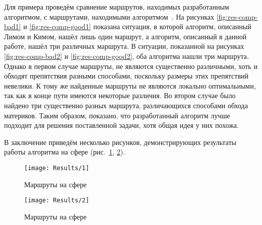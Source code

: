 Для примера проведём сравнение маршрутов, находимых разработанным
алгоритмом, с маршрутами, находимыми
алгоритмом~\cite{lim2005shortest}. На рисунках \ref{fig:res-comp-bad1}
и \ref{fig:res-comp-good1} показана ситуация, в которой алгоритм,
описанный Лимом и Кимом, нашёл лишь один маршрут, а алгоритм,
описанный в данной работе, нашёл три различных маршрута. В ситуации,
показанной на рисунках \ref{fig:res-comp-bad2} и
\ref{fig:res-comp-good2}, оба алгоритма нашли три маршрута. Однако в
первом случае маршруты, не являются существенно различными, хоть и
обходят препятствия разными способами, поскольку размеры этих
препятствий невелики. К тому же найденные маршруты не являются
локально оптимальными, так как в конце пути имеются некоторые
различия. Во втором случае было найдено три существенно разных
маршрута, различающихся способами обхода материков. Таким образом,
показано, что разработанный алгоритм лучше подходит для решения
поставленной задачи, хотя общая идея у них похожа.

В заключение приведём несколько рисунков, демонстрирующих результаты
работы алгоритма на сфере (рис.~\ref{fig:result1}, \ref{fig:result2}).

\begin{figure}
    \texttt{[image: Results/1]}
    \caption{Маршруты на сфере}
    \label{fig:result1}
\end{figure}

\begin{figure}
    \texttt{[image: Results/2]}
    \caption{Маршруты на сфере}
    \label{fig:result2}
\end{figure}

\FloatBarrier

